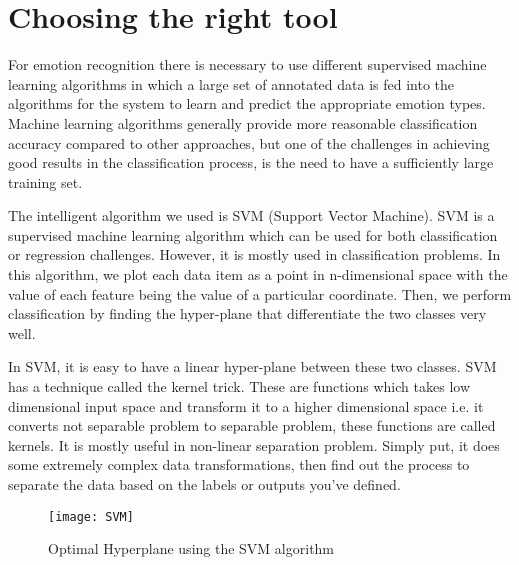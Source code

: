 \documentclass[runningheads,a4paper,11pt]{report}
\begin{document}
\section{Choosing the right tool}

	For emotion recognition there is necessary to use different supervised machine learning algorithms in which a large set of annotated data is fed into the algorithms for the system to learn and predict the appropriate emotion types.  Machine learning algorithms generally provide more reasonable classification accuracy compared to other approaches, but one of the challenges in achieving good results in the classification process, is the need to have a sufficiently large training set.
    
	The intelligent algorithm we used is SVM (Support Vector Machine).
    SVM is a supervised machine learning algorithm which can be used for both classification or regression challenges. However,  it is mostly used in classification problems. In this algorithm, we plot each data item as a point in n-dimensional space with the value of each feature being the value of a particular coordinate. Then, we perform classification by finding the hyper-plane that differentiate the two classes very well.
    
    In SVM, it is easy to have a linear hyper-plane between these two classes.  SVM has a technique called the kernel trick. These are functions which takes low dimensional input space and transform it to a higher dimensional space i.e. it converts not separable problem to separable problem, these functions are called kernels. It is mostly useful in non-linear separation problem. Simply put, it does some extremely complex data transformations, then find out the process to separate the data based on the labels or outputs you’ve defined. \cite{Ray17}
    \begin{figure}
    	\centerline{\texttt{[image: SVM]}}
   		\caption{Optimal Hyperplane using the SVM algorithm}
    \end{figure}
    
\end{document}
